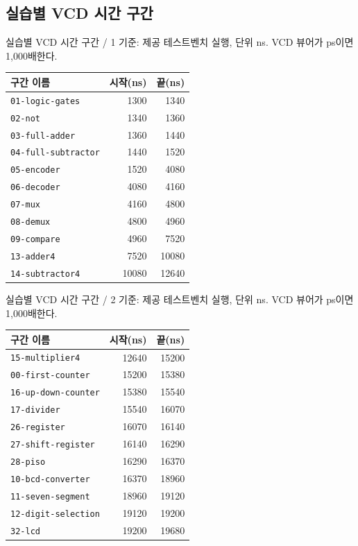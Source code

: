 \documentclass[aspectratio=169,11pt]{beamer}
\begin{document}
\subsection{실습별 VCD 시간 구간}
\begin{frame}[t]{실습별 VCD 시간 구간 / 1}
\fontsize{8}{9}\selectfont
기준: 제공 테스트벤치 실행, 단위 ns. VCD 뷰어가 ps이면 1,000배한다.
\begin{center}\renewcommand{\arraystretch}{1.05}
\begin{tabular}{lrr}\toprule
구간 이름 & 시작(ns) & 끝(ns)\\\midrule
\texttt{01-logic-gates} & 1300 & 1340 \\
\texttt{02-not} & 1340 & 1360 \\
\texttt{03-full-adder} & 1360 & 1440 \\
\texttt{04-full-subtractor} & 1440 & 1520 \\
\texttt{05-encoder} & 1520 & 4080 \\
\texttt{06-decoder} & 4080 & 4160 \\
\texttt{07-mux} & 4160 & 4800 \\
\texttt{08-demux} & 4800 & 4960 \\
\texttt{09-compare} & 4960 & 7520 \\
\texttt{13-adder4} & 7520 & 10080 \\
\texttt{14-subtractor4} & 10080 & 12640 \\
\bottomrule\end{tabular}\end{center}
\end{frame}
\begin{frame}[t]{실습별 VCD 시간 구간 / 2}
\fontsize{8}{9}\selectfont
기준: 제공 테스트벤치 실행, 단위 ns. VCD 뷰어가 ps이면 1,000배한다.
\begin{center}\renewcommand{\arraystretch}{1.05}
\begin{tabular}{lrr}\toprule
구간 이름 & 시작(ns) & 끝(ns)\\\midrule
\texttt{15-multiplier4} & 12640 & 15200 \\
\texttt{00-first-counter} & 15200 & 15380 \\
\texttt{16-up-down-counter} & 15380 & 15540 \\
\texttt{17-divider} & 15540 & 16070 \\
\texttt{26-register} & 16070 & 16140 \\
\texttt{27-shift-register} & 16140 & 16290 \\
\texttt{28-piso} & 16290 & 16370 \\
\texttt{10-bcd-converter} & 16370 & 18960 \\
\texttt{11-seven-segment} & 18960 & 19120 \\
\texttt{12-digit-selection} & 19120 & 19200 \\
\texttt{32-lcd} & 19200 & 19680 \\
\bottomrule\end{tabular}\end{center}
\end{frame}
\end{document}
